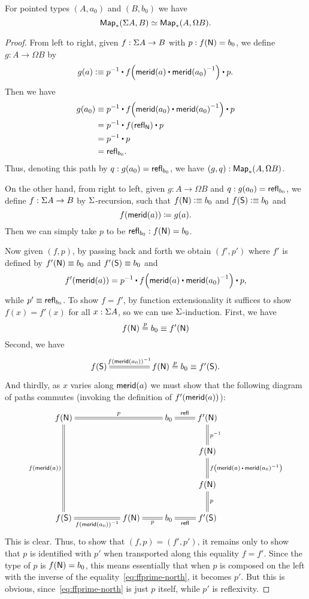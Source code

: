 \begin{lem}\label{lem:susp-loop-adj}
  For pointed types $(A,a_0)$ and $(B,b_0)$ we have
  \[ \mathsf{Map}_*(\Sigma A, B) \simeq \mathsf{Map}_*(A,\Omega B).\]
\end{lem}
\begin{proof}
  From left to right, given $f:\Sigma A \to B$ with $p:f(\mathsf{N}) = b_0$, we define $g:A \to \Omega B$ by
  \[g(a) \defeq \opp p \ct \ap f{\merid(a) \ct \opp{\merid(a_0)}} \ct p.\]
  Then we have
  \begin{align*}
    g(a_0) &\jdeq \opp p \ct \ap f{\merid(a_0) \ct \opp{\merid(a_0)}} \ct p\\
    &= \opp p \ct \ap f{\refl{\north}} \ct p\\
    &= \opp p \ct p\\
    &= \refl{b_0}.
  \end{align*}
  Thus, denoting this path by $q:g(a_0)=\mathsf{refl}_{b_0}$, we have $(g,q):\mathsf{Map}_*(A,\Omega B)$.

  On the other hand, from right to left, given $g:A\to \Omega B$ and $q:g(a_0)=\mathsf{refl}_{b_0}$, we define $f:\Sigma A \to B$ by $\Sigma$-recursion, such that $f(\mathsf{N})\vcentcolon\equiv b_0$ and $f(\mathsf{S})\vcentcolon\equiv b_0$ and
  \[ {f}\mathopen{}\left({\mathsf{merid}(a)}\right)\mathclose{} \coloneqq g(a). \]
  Then we can simply take $p$ to be $\mathsf{refl}_{b_0} : f(\mathsf{N})= b_0$.

  Now given $(f,p)$, by passing back and forth we obtain $(f',p')$ where $f'$ is defined by $f'(\mathsf{N})\equiv b_0$ and $f'(\mathsf{S})\equiv b_0$ and
  \[ \ap {f'} {\merid(a)} = \opp p \ct \ap f{\merid(a) \ct \opp{\merid(a_0)}} \ct p, \]
  while $p' \equiv \mathsf{refl}_{b_0}$.
  To show $f=f'$, by function extensionality it suffices to show $f(x)=f'(x)$ for all $x:\Sigma A$, so we can use $\Sigma$-induction.
  First, we have
  \begin{equation}
    f(\north) \overset{p}{=} b_0 \jdeq f'(\north)\label{eq:ffprime-north}
  \end{equation}
  Second, we have
  \[\xymatrix@C=4pc{ f(\south) \ar@{=}[r]^-{\opp{\ap f {\merid(a_0)}}} & f(\north) \overset{\smash p}{=} b_0 \jdeq f'(\south).}\]
  And thirdly, as $x$ varies along $\mathsf{merid}(a)$ we must show that the following diagram of paths commutes (invoking the definition of ${f'}\mathopen{}\left({\mathsf{merid}(a)}\right)\mathclose{}$):
  \[ \xymatrix{
    f(\north) \ar@{=}[rrr]^-{p} \ar@{=}[ddd]_{f(\merid(a))} &&&
    b_0 \ar@{=}[r]^-{\refl{}} &
    f'(\north) \ar@{=}[d]^{\opp p}\\
    &&&& f(\north) \ar@{=}[d]^{\ap f{\merid(a) \ct \opp{\merid(a_0)}}}\\
    &&&& f(\north) \ar@{=}[d]^p\\
    f(\south) \ar@{=}[rr]_-{\opp{\ap f {\merid(a_0)}}} &&
    f(\north) \ar@{=}[r]_-p &
    b_0 \ar@{=}[r]_-{\refl{}} &
    f'(\south) }
  \]
  This is clear.
  Thus, to show that $(f,p)=(f',p')$, it remains only to show that $p$ is identified with $p'$ when transported along this equality $f=f'$.
  Since the type of $p$ is $f(\mathsf{N})=b_0$, this means essentially that when $p$ is composed on the left with the inverse of the equality~\eqref{eq:ffprime-north}, it becomes $p'$.
  But this is obvious, since~\eqref{eq:ffprime-north} is just $p$ itself, while $p'$ is reflexivity.


\end{proof}
